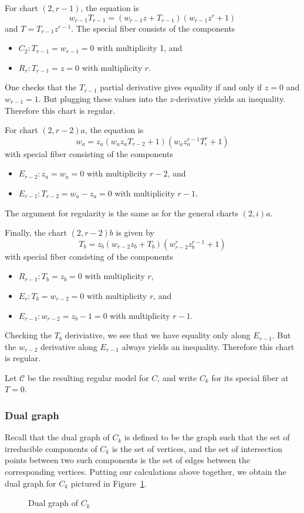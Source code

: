 \documentclass{article}
\newcommand{\scd}{\mathscr{C}}
\theoremstyle{plain}
\theoremstyle{definition}
\theoremstyle{remark}
\begin{document}
  For chart $(2, r-1)$, the equation is
  \[
  w_{r-1} T_{r-1} = (w_{r-1} z + T_{r-1}) (w_{r-1} z^{r} + 1)
  \]
  and $T = T_{r-1} z^{r-1}$. The special fiber consists of the components
  \begin{itemize}
      \item $C_2: T_{r-1} = w_{r-1} = 0$ with multiplicity 1, and
      \item $R_r: T_{r-1} = z = 0$ with multiplicity $r$.
  \end{itemize}
  One checks that the $T_{r-1}$ partial derivative gives equality if and only if $z = 0$ and $w_{r-1} = 1$. But plugging these values into the $z$-derivative yields an inequality. Therefore this chart is regular.

  For chart $(2, r-2)a$, the equation is
  \[
  w_a = z_a (w_a z_a T_{r-2} + 1) ( w_a z_a^{r-1} T_i^{r} + 1)
  \]
  with special fiber consisting of the components
  \begin{itemize}
      \item $E_{r-2}: z_a = w_a = 0$ with multiplicity $r-2$, and
      \item $E_{r-1}: T_{r-2} = w_a - z_a = 0$ with multiplicity $r-1$.
  \end{itemize}
  The argument for regularity is the same as for the general charts $(2,i)a$.

  Finally, the chart $(2, r-2)b$ is given by
  \[
  T_b = z_b (w_{r-2} z_b + T_b) (w_{r-2}^{r} z_b^{r-1} + 1)
  \]
  with special fiber consisting of the components
  \begin{itemize}
      \item $R_{r-1}: T_b = z_b = 0$ with multiplicity $r$,
      \item $E_r: T_b = w_{r-2} = 0$ with multiplicity $r$, and
      \item $E_{r-1}: w_{r-2} = z_b - 1 = 0$ with multiplicity $r-1$.
  \end{itemize}
  Checking the $T_b$ deriviative, we see that we have equality only along $E_{r-1}$. But the $w_{r-2}$ derivative along $E_{r-1}$ always yields an inequality. Therefore this chart is regular.

  Let $\scd$ be the resulting regular model for $C$, and write $C_k$ for its special fiber at $T = 0$.

\subsubsection{Dual graph}
\label{sec:dual-graph}

Recall that the dual graph of $C_k$ is defined to be the graph such that the set of irreducible components of $C_k$ is the set of vertices, and the set of intersection points between two such components is the set of edges between the corresponding vertices. Putting our calculations above together, we obtain the dual graph for $C_k$ pictured in Figure~\ref{fig:superelliptic-dual-graph}.
\begin{figure}\centering
    
  \caption{Dual graph of $C_k$}
\label{fig:superelliptic-dual-graph}
\end{figure}
\end{document}
